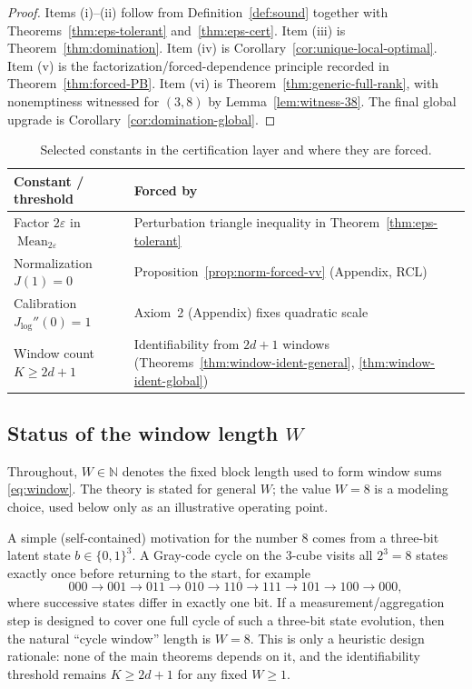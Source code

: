 \documentclass[11pt,reqno]{amsart}
\theoremstyle{definition}
\theoremstyle{remark}
\newcommand{\1}{\mathbf{1}}
\newcommand{\Mean}{\operatorname{Mean}}
\providecommand{\N}{\mathbb{N}}
\newcommand{\eps}{\varepsilon}
\begin{document}
\begin{proof}
Items (i)–(ii) follow from Definition~\ref{def:sound} together with Theorems~\ref{thm:eps-tolerant} and~\ref{thm:eps-cert}.  Item (iii) is Theorem~\ref{thm:domination}.  Item (iv) is Corollary~\ref{cor:unique-local-optimal}.  Item (v) is the factorization/forced-dependence principle recorded in Theorem~\ref{thm:forced-PB}.  Item (vi) is Theorem~\ref{thm:generic-full-rank}, with nonemptiness witnessed for $(3,8)$ by Lemma~\ref{lem:witness-38}.  The final global upgrade is Corollary~\ref{cor:domination-global}.
\end{proof}

\begin{table}[t]
\centering
\caption{Selected constants in the certification layer and where they are forced.}
\label{tab:forced-constants}
\begin{tabular}{ll}
\hline
Constant / threshold & Forced by \\
\hline
Factor $2\eps$ in $\Mean_{2\eps}$ & Perturbation triangle inequality in Theorem~\ref{thm:eps-tolerant} \\
Normalization $J(1)=0$ & Proposition~\ref{prop:norm-forced-vv} (Appendix, RCL) \\
Calibration $J_{\log}''(0)=1$ & Axiom~2 (Appendix) fixes quadratic scale \\
Window count $K\ge 2d+1$ & Identifiability from $2d+1$ windows (Theorems~\ref{thm:window-ident-general}, \ref{thm:window-ident-global}) \\
\hline
\end{tabular}
\end{table}



\subsection{Status of the window length \texorpdfstring{$W$}{W}}\label{subsec:status-W}
Throughout, $W\in\N$ denotes the fixed block length used to form window sums \eqref{eq:window}.
The theory is stated for general $W$; the value $W=8$ is a modeling choice, used below only as an
illustrative operating point.

A simple (self-contained) motivation for the number $8$ comes from a three-bit latent state
$b\in\{0,1\}^3$. A Gray-code cycle on the 3-cube visits all $2^3=8$ states exactly once before
returning to the start, for example
\[
000\to 001\to 011\to 010\to 110\to 111\to 101\to 100\to 000,
\]
where successive states differ in exactly one bit. If a measurement/aggregation step is designed to
cover one full cycle of such a three-bit state evolution, then the natural ``cycle window'' length is
$W=8$. This is only a heuristic design rationale: none of the main theorems depends on it, and the
identifiability threshold remains $K\ge 2d+1$ for any fixed $W\ge 1$.
\end{document}

